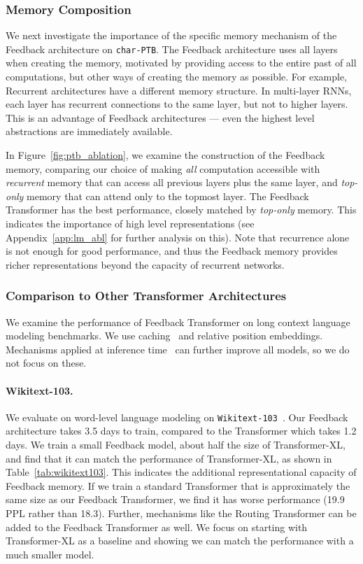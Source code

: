 \documentclass{article} \usepackage{iclr2021_conference}
\newcommand{\app}[1]{Appendix~\ref{app:#1}}
\begin{document}
\subsubsection{Memory Composition}
\label{sec:ptb_abl}

We next investigate the importance of the specific memory mechanism of the Feedback architecture on \texttt{char-PTB}. The Feedback architecture uses all layers when creating the memory, motivated by providing access to the entire past of all computations, but other ways of creating the memory as possible. For example, Recurrent architectures have a different memory structure. In multi-layer RNNs, each layer has recurrent connections to the same layer, but not to higher layers. This is an advantage of Feedback architectures --- even the highest level abstractions are immediately available. 

In Figure~\ref{fig:ptb_ablation}, we examine the construction of the Feedback memory, comparing our choice of making \textit{all} computation accessible with \textit{recurrent} memory that can access all previous layers plus the same layer, and \textit{top-only} memory that can attend only to the topmost layer. The Feedback Transformer has the best performance, closely matched by \textit{top-only} memory. This indicates the importance of high level representations (see \app{lm_abl} for further analysis on this). Note that recurrence alone is not enough for good performance, and thus the Feedback memory provides richer representations beyond the capacity of recurrent networks. 

\subsubsection{Comparison to Other Transformer Architectures}

We examine the performance of Feedback Transformer on long context language modeling benchmarks. We use caching~\citep{dai2019transformer} and relative position embeddings. 
Mechanisms applied at inference time~\citep{khandelwal2019generalization,krause2019dynamic} can further improve all models, so we do not focus on these.

\paragraph{Wikitext-103.}

We evaluate on word-level language modeling on \texttt{Wikitext-103}~\citep{merity2017regularizing}. Our Feedback architecture takes 3.5 days to train, compared to the Transformer which takes 1.2 days. 
We train a small Feedback model, about half the size of Transformer-XL, and find that it can match the performance of Transformer-XL, as shown in Table~\ref{tab:wikitext103}. This indicates the additional representational capacity of Feedback memory. 
If we train a standard Transformer that is approximately the same size as our Feedback Transformer, we find it has worse performance (19.9 PPL rather than 18.3). 
Further, mechanisms like the Routing Transformer can be added to the Feedback Transformer as well. We focus on starting with Transformer-XL as a baseline and showing we can match the performance with a much smaller model.
\end{document}
